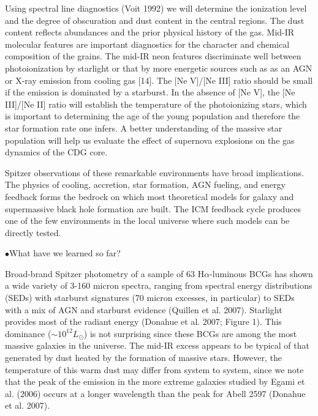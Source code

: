 \documentclass[letterpaper,12pt]{article}
\begin{document}
 Using spectral line diagnostics (Voit 1992) we will determine the
ionization level and the degree of obscuration and dust content in the
central regions.  The dust content reflects abundances and the prior
physical history of the gas.  Mid-IR molecular features are important
diagnostics for the character and chemical composition of the grains.
The mid-IR neon features discriminate well between photoionization by
starlight or that by more energetic sources such as as an AGN or X-ray
emission from cooling gas [14].  The [Ne V]/[Ne III] ratio should be
small if the emission is dominated by a starburst.  In the absence of
[Ne V], the [Ne III]/[Ne II] ratio will establish the temperature of
the photoionizing stars, which is important to determining the age of
the young population and therefore the star formation rate one
infers.  A better understanding of the massive star population will
help us evaluate the effect of supernova explosions on the gas
dynamics of the CDG core.

\smallskip

Spitzer observations of these remarkable environments have broad
implications. The physics of cooling, accretion, star formation, AGN
fueling, and energy feedback forms the bedrock on which most
theoretical models for galaxy and supermassive black hole formation
are built.  The ICM feedback cycle produces one of the few
environments in the local universe where such models can be directly
tested.  

\vspace{0.5cm}\noindent$\bullet${\sc What have we learned so far?}

Broad-brand Spitzer photometry of a sample of 63 H$\alpha$-luminous BCGs
has shown a wide variety of 3-160 micron spectra, ranging from spectral energy
distributions (SEDs) with
starburst signatures (70 micron excesses, in particular) to SEDs with a mix
of AGN and starburst evidence (Quillen et al. 2007).  Starlight provides  most of the
radiant energy (Donahue et al. 2007; Figure 1). This dominance ($\sim 10^{12} L_\odot$) 
is not surprising since these BCGs are among the most massive galaxies in the universe.
The mid-IR excess appears to be typical of that generated by dust heated by the
formation of massive stars. However, the temperature of this warm dust may differ from system
to system, since we note that the peak of the emission in the more extreme galaxies studied by
Egami et al. (2006) occurs at a longer wavelength than the peak for Abell 2597 (Donahue et al. 2007).
\end{document}
